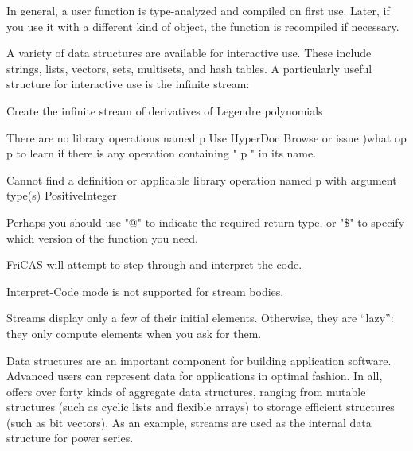 In general, a user function is type-analyzed and compiled on first use.
Later, if you use it with a different kind of object, the function
is recompiled if necessary.


A variety of data structures are available for interactive use.
These include strings, lists, vectors, sets, multisets, and hash
tables.
A particularly useful structure for interactive use is the
infinite stream:

%
\begin{xtc}
\begin{xtccomment}
Create the infinite stream of derivatives of Legendre
polynomials
\end{xtccomment}
\begin{spadsrc}
[D(p(i),x) for i in 1..]
\end{spadsrc}
\begin{MessageOutput}
   There are no library operations named p 
      Use HyperDoc Browse or issue
                                 )what op p
      to learn if there is any operation containing " p " in its name.
\end{MessageOutput}
\begin{MessageOutput}
   Cannot find a definition or applicable library operation named p 
      with argument type(s) 
                               PositiveInteger
      
      Perhaps you should use "@" to indicate the required return type, 
      or "\$" to specify which version of the function you need.
\end{MessageOutput}
\begin{MessageOutput}
   FriCAS will attempt to step through and interpret the code.
\end{MessageOutput}
\begin{MessageOutput}
   Interpret-Code mode is not supported for stream bodies.
\end{MessageOutput}
\end{xtc}

Streams display only a few of their initial elements.
Otherwise, they are ``lazy'': they
only compute elements when you ask for them.

Data structures are an important component for building
application software. Advanced users can
represent data for applications in optimal fashion.
In all, \Language{} offers
over forty kinds of aggregate data structures, ranging
from mutable structures (such as cyclic lists and flexible arrays) to
storage efficient structures (such as bit vectors).
As an example, streams are used as the internal data structure
for power series.

